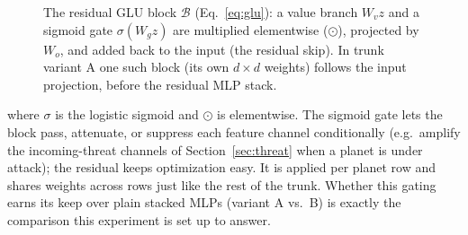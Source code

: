 \documentclass[11pt]{article}
\begin{document}
\begin{figure}[h]
\centering
{}
\caption{The residual GLU block $\mathcal{B}$ (Eq.~\ref{eq:glu}): a value branch $W_v z$ and a
sigmoid gate $\sigma(W_g z)$ are multiplied elementwise ($\odot$), projected by $W_o$, and added
back to the input (the residual skip). In trunk variant A one such block (its own $d\times d$
weights) follows the input projection, before the residual MLP stack.}
\label{fig:glu}
\end{figure}

where $\sigma$ is the logistic sigmoid and $\odot$ is elementwise. The sigmoid gate lets the
block pass, attenuate, or suppress each feature channel conditionally (e.g.\ amplify the
incoming-threat channels of Section~\ref{sec:threat} when a planet is under attack); the
residual keeps optimization easy. It is applied per planet row and shares weights across rows
just like the rest of the trunk. Whether this gating earns its keep over plain stacked MLPs
(variant A vs.\ B) is exactly the comparison this experiment is set up to answer.
\end{document}
